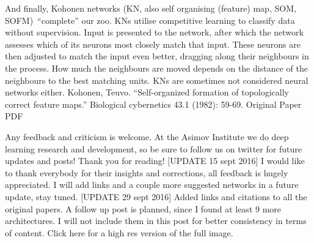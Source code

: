 \documentclass[11pt,a4paper,oneside]{ctexbook}
\begin{document}
And finally, Kohonen networks (KN, also self organising (feature) map, SOM, SOFM) “complete” our zoo. KNs utilise competitive learning to classify data without supervision. Input is presented to the network, after which the network assesses which of its neurons most closely match that input. These neurons are then adjusted to match the input even better, dragging along their neighbours in the process. How much the neighbours are moved depends on the distance of the neighbours to the best matching units. KNs are sometimes not considered neural networks either.
Kohonen, Teuvo. “Self-organized formation of topologically correct feature maps.” Biological cybernetics 43.1 (1982): 59-69.
Original Paper PDF

Any feedback and criticism is welcome. At the Asimov Institute we do deep learning research and development, so be sure to follow us on twitter for future updates and posts! Thank you for reading!
[UPDATE 15 sept 2016] I would like to thank everybody for their insights and corrections, all feedback is hugely appreciated. I will add links and a couple more suggested networks in a future update, stay tuned.
[UPDATE 29 sept 2016] Added links and citations to all the original papers. A follow up post is planned, since I found at least 9 more architectures. I will not include them in this post for better consistency in terms of content.
Click here for a high res version of the full image.
\end{document}
